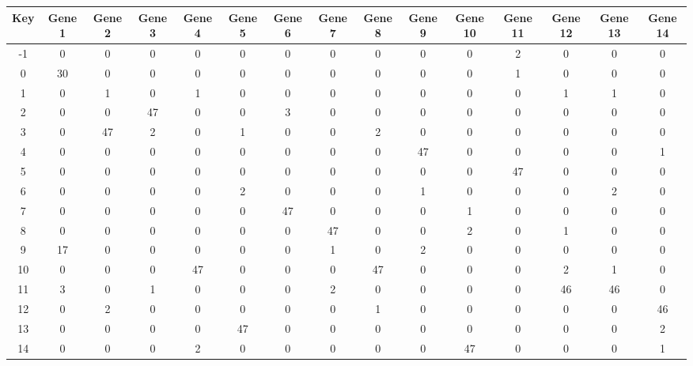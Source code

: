 \begin{tabular}{|c|c|c|c|c|c|c|c|c|c|c|c|c|c|c|}
\hline
Key & Gene 1 & Gene 2 & Gene 3 & Gene 4 & Gene 5 & Gene 6 & Gene 7 & Gene 8 & Gene 9 & Gene 10 & Gene 11 & Gene 12 & Gene 13 & Gene 14 \\
\hline
-1 & 0 & 0 & 0 & 0 & 0 & 0 & 0 & 0 & 0 & 0 & 2 & 0 & 0 & 0 \\
0 & 30 & 0 & 0 & 0 & 0 & 0 & 0 & 0 & 0 & 0 & 1 & 0 & 0 & 0 \\
1 & 0 & 1 & 0 & 1 & 0 & 0 & 0 & 0 & 0 & 0 & 0 & 1 & 1 & 0 \\
2 & 0 & 0 & 47 & 0 & 0 & 3 & 0 & 0 & 0 & 0 & 0 & 0 & 0 & 0 \\
3 & 0 & 47 & 2 & 0 & 1 & 0 & 0 & 2 & 0 & 0 & 0 & 0 & 0 & 0 \\
4 & 0 & 0 & 0 & 0 & 0 & 0 & 0 & 0 & 47 & 0 & 0 & 0 & 0 & 1 \\
5 & 0 & 0 & 0 & 0 & 0 & 0 & 0 & 0 & 0 & 0 & 47 & 0 & 0 & 0 \\
6 & 0 & 0 & 0 & 0 & 2 & 0 & 0 & 0 & 1 & 0 & 0 & 0 & 2 & 0 \\
7 & 0 & 0 & 0 & 0 & 0 & 47 & 0 & 0 & 0 & 1 & 0 & 0 & 0 & 0 \\
8 & 0 & 0 & 0 & 0 & 0 & 0 & 47 & 0 & 0 & 2 & 0 & 1 & 0 & 0 \\
9 & 17 & 0 & 0 & 0 & 0 & 0 & 1 & 0 & 2 & 0 & 0 & 0 & 0 & 0 \\
10 & 0 & 0 & 0 & 47 & 0 & 0 & 0 & 47 & 0 & 0 & 0 & 2 & 1 & 0 \\
11 & 3 & 0 & 1 & 0 & 0 & 0 & 2 & 0 & 0 & 0 & 0 & 46 & 46 & 0 \\
12 & 0 & 2 & 0 & 0 & 0 & 0 & 0 & 1 & 0 & 0 & 0 & 0 & 0 & 46 \\
13 & 0 & 0 & 0 & 0 & 47 & 0 & 0 & 0 & 0 & 0 & 0 & 0 & 0 & 2 \\
14 & 0 & 0 & 0 & 2 & 0 & 0 & 0 & 0 & 0 & 47 & 0 & 0 & 0 & 1 \\
\hline
\end{tabular}